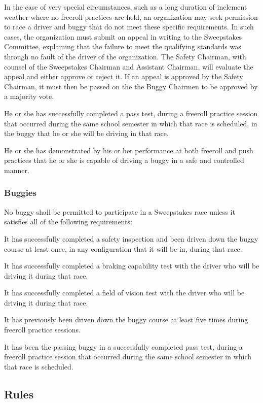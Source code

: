 \documentclass[openany]{book}
\begin{document}
In the case of very special circumstances, such as a long duration of inclement weather where no freeroll practices are held, an organization may seek permission to race a driver and buggy that do not meet these specific requirements. In such cases, the organization must submit an appeal in writing to the Sweepstakes Committee, explaining that the failure to meet the qualifying standards was through no fault of the driver of the organization. The Safety Chairman, with counsel of the Sweepstakes Chairman and Assistant Chairman, will evaluate the appeal and either approve or reject it. If an appeal is approved by the Safety Chairman, it must then be passed on the the Buggy Chairmen to be approved by a majority vote.

He or she has successfully completed a pass test, during a freeroll practice session that occurred during the same school semester in which that race is scheduled, in the buggy that he or she will be driving in that race.

He or she has demonstrated by his or her performance at both freeroll and push practices that he or she is capable of driving a buggy in a safe and controlled manner.

\subsubsection{Buggies}

No buggy shall be permitted to participate in a Sweepstakes race unless it satisfies all of the following requirements:

It has successfully completed a safety inspection and been driven down the buggy course at least once, in any configuration that it will be in, during that race.

It has successfully completed a braking capability test with the driver who will be driving it during that race.

It has successfully completed a field of vision test with the driver who will be driving it during that race.

It has previously been driven down the buggy course at least five times during freeroll practice sessions.

It has been the passing buggy in a successfully completed pass test, during a freeroll practice session that occurred during the same school semester in which that race is scheduled.

\subsection{Rules}
\end{document}
